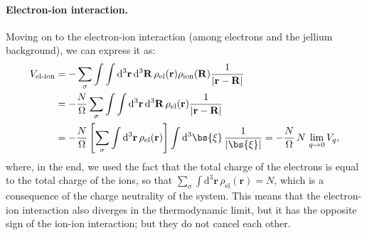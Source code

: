 \paragraph{Electron-ion interaction.}
Moving on to the electron-ion interaction (among electrons and the jellium background), we can express it as:
\[
    \begin{aligned}
        V_{\text{el-ion}} & = - \sum_{\sigma} \int \int \mathrm{d}^3 \mathbf{r} \, \mathrm{d}^3 \mathbf{R} \, \rho_{\text{el}}(\mathbf{r}) \rho_{\text{ion}}(\mathbf{R}) \frac{1}{|\mathbf{r} - \mathbf{R}|}                               \\
                          & = - \frac{N}{\Omega} \sum_{\sigma} \int \int \mathrm{d}^3 \mathbf{r} \, \mathrm{d}^3 \mathbf{R} \, \rho_{\text{el}}(\mathbf{r}) \frac{1}{|\mathbf{r} - \mathbf{R}|}                                            \\
                          & = -\frac{N}{\Omega} \left[ \sum_{\sigma} \int \mathrm{d}^3 \mathbf{r} \, \rho_{\text{el}}(\mathbf{r}) \right] \int \mathrm{d}^3 \bs{\xi} \, \frac{1}{|\bs{\xi}|} = -\frac{N}{\Omega}\, N\, \lim_{q \to 0} V_q,
    \end{aligned}
\]
where, in the end, we used the fact that the total charge of the electrons is equal to the total charge of the ions, so that \(\sum_{\sigma} \int \mathrm{d}^3 \mathbf{r} \, \rho_{\text{el}}(\mathbf{r}) = N\), which is a consequence of the charge neutrality of the system. This means that the electron-ion interaction also diverges in the thermodynamic limit, but it has the opposite sign of the ion-ion interaction; but they do not cancel each other.

